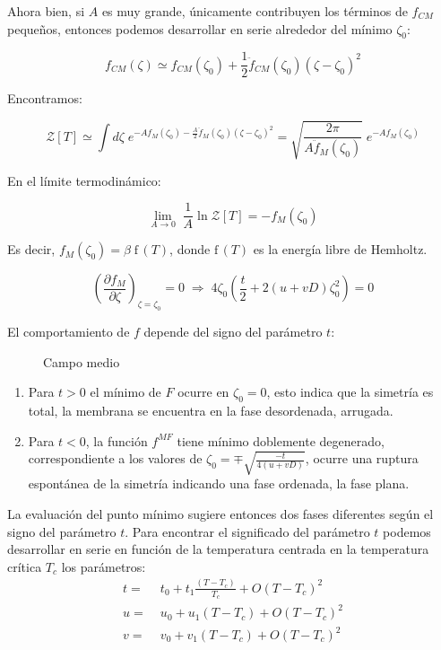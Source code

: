 Ahora bien, si $A$ es muy grande, únicamente contribuyen los términos de
$f_{CM}$ pequeños, entonces podemos desarrollar en serie alrededor del mínimo
$\zeta_0$:

\begin{equation*}
f_{CM}(\zeta)\simeq f_{CM}(\zeta_0)+\frac{1}{2}\ddot{f}_{CM}(\zeta_0)(\zeta-\zeta_0)^2
\end{equation*}

Encontramos:

\begin{equation*}
 \mathcal{Z}[T]\simeq\int
 d\zeta\;e^{-Af_M(\zeta_0)-\frac{A}{2}\ddot{f}_M(\zeta_0)(\zeta-\zeta_0)^2}=
 \sqrt{\frac{2\pi}{A\ddot{f}_M(\zeta_0)}}\; e^{-Af_M(\zeta_0)}
\end{equation*}

En el límite termodinámico:

\begin{equation*}
\lim_{A\rightarrow 0}\; \frac{1}{A} \ln \mathcal{Z}[T]=-f_M(\zeta_0)
\end{equation*}

Es decir, $f_M(\zeta_0)=\beta \;\text{f}\,(T)$, donde
$\text{f}\,(T)$ es la energía libre de Hemholtz. 

\begin{equation*}
\left(\frac{\partial f_M}{\partial \zeta}\right)_{\!\zeta=\zeta_0}\!=0 \; \Rightarrow \; 4\zeta_0\left(\frac{t}{2}+2(u+vD)\zeta_0^2\right)=0
\end{equation*}

El comportamiento de $f$ depende del signo del parámetro $t$:

\begin{figure}[h]
\centering
 \resizebox{\columnwidth}{!}{}
\caption{Campo medio}
\end{figure} 

\begin{enumerate}
\item Para $t>0$ el mínimo de $F$ ocurre en $\zeta_0=0$, esto indica que la
  simetría es total, la membrana se encuentra en la fase desordenada,
  arrugada.
\item Para $t<0$, la función $f^{MF}$ tiene mínimo doblemente
  degenerado, correspondiente a los valores de $\zeta_0=\mp
  \sqrt{\frac{-t}{4(u+vD)}}$, ocurre una ruptura espontánea de la simetría indicando
  una fase ordenada, la fase plana.
\end{enumerate}

La evaluación del punto mínimo sugiere entonces dos fases diferentes según el
signo del parámetro $t$. Para encontrar el significado del parámetro $t$
podemos desarrollar en serie en función de la temperatura centrada en la
temperatura crítica $T_c$ los parámetros:
\begin{align}
t=&\; t_0+t_1\frac{(T-T_c)}{T_c}+O(T-T_c)^2\\
u=&\; u_0+u_1(T-T_c)+O(T-T_c)^2\\
v=&\; v_0+v_1(T-T_c)+O(T-T_c)^2
\end{align}



